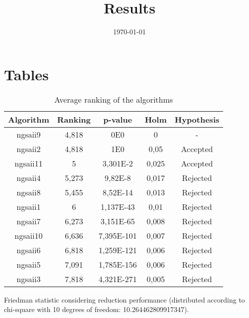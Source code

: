 \documentclass{article}
\title{Results}
\author{}
\date{\today}
\begin{document}
\oddsidemargin 0in \topmargin 0in\maketitle

\section{Tables}
\begin{table}[!htp]
\centering
\begin{tabular}{c|c|c|c|c}
Algorithm&Ranking&p-value&Holm&Hypothesis\\
\hline
ngsaii9 & 4,818 & 0E0 & 0 & -\\
ngsaii2 & 4,818 & 1E0 & 0,05 & Accepted\\
ngsaii11 & 5 & 3,301E-2 & 0,025 & Accepted\\
ngsaii4 & 5,273 & 9,82E-8 & 0,017 & Rejected\\
ngsaii8 & 5,455 & 8,52E-14 & 0,013 & Rejected\\
ngsaii1 & 6 & 1,137E-43 & 0,01 & Rejected\\
ngsaii7 & 6,273 & 3,151E-65 & 0,008 & Rejected\\
ngsaii10 & 6,636 & 7,395E-101 & 0,007 & Rejected\\
ngsaii6 & 6,818 & 1,259E-121 & 0,006 & Rejected\\
ngsaii5 & 7,091 & 1,785E-156 & 0,006 & Rejected\\
ngsaii3 & 7,818 & 4,321E-271 & 0,005 & Rejected\\
\end{tabular}
\caption{Average ranking of the algorithms}
\end{table}


Friedman statistic considering reduction performance (distributed according to chi-square with 10 degrees of freedom: 10.264462809917347).
\end{document}
